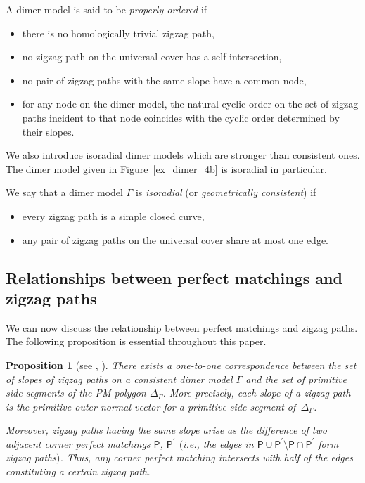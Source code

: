 \documentclass[pdftex]{sigma}%
\numberwithin{equation}{section}
\numberwithin{figure}{section}
\numberwithin{table}{section}
\newtheorem{Proposition}[Theorem]{Proposition}
 { \theoremstyle{definition}
\newtheorem{Definition}[Theorem]{Definition}
\newtheorem{Note}[Theorem]{Note}
\newtheorem{Example}[Theorem]{Example}
\newtheorem{Remark}[Theorem]{Remark}
\newtheorem{observation}[Theorem]{Observation}
\newtheorem{operation}[Theorem]{Operation}
\newtheorem{setting}[Theorem]{Setting}}
\newcommand{\sfP}{\mathsf{P}}
\begin{document}
\begin{Definition}\label{def_properly}
A dimer model is said to be \emph{properly ordered} if
\begin{itemize}\itemsep=0pt
\item [(1)] there is no homologically trivial zigzag path,
\item [(2)] no zigzag path on the universal cover has a self-intersection,
\item [(3)] no pair of zigzag paths with the same slope have a common node,
\item [(4)] for any node on the dimer model, the natural cyclic order on the set of zigzag paths incident to that node
coincides with the cyclic order determined by their slopes.
\end{itemize}
\end{Definition}

We also introduce isoradial dimer models which are stronger than consistent ones.
The dimer model given in Figure~\ref{ex_dimer_4b} is isoradial in particular.

\begin{Definition}
\label{def_isoradial}
We say that a dimer model $\Gamma$ is \emph{isoradial} (or \emph{geometrically consistent}) if
\begin{itemize}\itemsep=0pt
\item [(1)] every zigzag path is a simple closed curve,
\item [(2)] any pair of zigzag paths on the universal cover share at most one edge.
\end{itemize}
\end{Definition}

\subsection{Relationships between perfect matchings and zigzag paths}\label{subsec_relation_zigzag_pm}

We can now discuss the relationship between perfect matchings and zigzag paths.
The following proposition is essential throughout this paper.

\begin{Proposition}[{see \cite[Theorem~3.3 and Corollary~3.8]{Gul}, \cite[Proposition~9.2 and Corollary~9.3]{IU2}}]\label{zigzag_sidepolygon}
There exists a one-to-one correspondence between the set of slopes of zigzag paths on a consistent dimer model $\Gamma$ and
the set of primitive side segments of the PM polygon $\Delta_\Gamma$. More precisely, each slope of a zigzag path is the primitive outer normal vector for a primitive side segment of~$\Delta_\Gamma$.

Moreover, zigzag paths having the same slope arise as the difference of two adjacent corner perfect matchings $\sfP$, $\sfP^\prime$ $($i.e., the edges in $\sfP\cup\sfP^\prime{\setminus}\sfP\cap\sfP^\prime$ form zigzag paths$)$. Thus, any corner perfect matching intersects with half of the edges constituting a certain zigzag path.
\end{Proposition}
\end{document}
